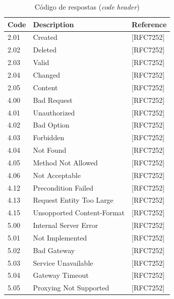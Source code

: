 \begin{table}[!htb]
	\centering
	\footnotesize\setlength{\tabcolsep}{25pt}
	\caption{Código de respostas (\textit{code} \textit{header})}
	\label{coap_resposta_code}
	\begin{tabular}{l|l|l}
		\hline
		Code & Description                & Reference     \\ \hline
		2.01 & Created                    & {[}RFC7252{]} \\ \hline
		2.02 & Deleted                    & {[}RFC7252{]} \\ \hline
		2.03 & Valid                      & {[}RFC7252{]} \\ \hline
		2.04 & Changed                    & {[}RFC7252{]} \\ \hline
		2.05 & Content                    & {[}RFC7252{]} \\ \hline
		4.00 & Bad Request                & {[}RFC7252{]} \\ \hline
		4.01 & Unauthorized               & {[}RFC7252{]} \\ \hline
		4.02 & Bad Option                 & {[}RFC7252{]} \\ \hline
		4.03 & Forbidden                  & {[}RFC7252{]} \\ \hline
		4.04 & Not Found                  & {[}RFC7252{]} \\ \hline
		4.05 & Method Not Allowed         & {[}RFC7252{]} \\ \hline
		4.06 & Not Acceptable             & {[}RFC7252{]} \\ \hline
		4.12 & Precondition Failed        & {[}RFC7252{]} \\ \hline
		4.13 & Request Entity Too Large   & {[}RFC7252{]} \\ \hline
		4.15 & Unsopported Content-Format & {[}RFC7252{]} \\ \hline
		5.00 & Internal Server Error      & {[}RFC7252{]} \\ \hline
		5.01 & Not Implemented            & {[}RFC7252{]} \\ \hline
		5.02 & Bad Gateway                & {[}RFC7252{]} \\ \hline
		5.03 & Service Unavailable        & {[}RFC7252{]} \\ \hline
		5.04 & Gateway Timeout            & {[}RFC7252{]} \\ \hline
		5.05 & Proxying Not Supported     & {[}RFC7252{]} \\ \hline
	\end{tabular}
\end{table}


